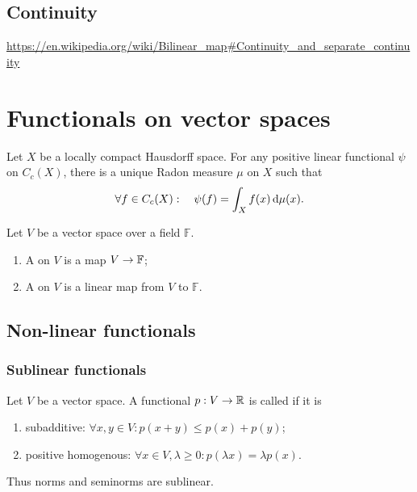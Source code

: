 \section{Continuity}
\url{https://en.wikipedia.org/wiki/Bilinear_map#Continuity_and_separate_continuity}



















\chapter{Functionals on vector spaces}

\begin{theorem}
Let $X$ be a locally compact Hausdorff space. For any positive linear functional $\psi$ on $C_c(X)$, there is a unique Radon measure $\mu$ on $X$ such that
\[ \forall f\in C_c(X): \quad \psi(f) = \int_X f(x)\operatorname{d \!}{\mu(x)}. \]
\end{theorem}

\begin{definition}
Let $V$ be a vector space over a field $\mathbb{F}$.
\begin{enumerate}
\item A  on $V$ is a map $V\to \mathbb{F}$;
\item A  on $V$ is a linear map from $V$ to $\mathbb{F}$.
\end{enumerate}
\end{definition}

\section{Non-linear functionals}
\subsection{Sublinear functionals}
\begin{definition}
Let $V$ be a vector space. A functional $p:V\to \mathbb{R}$ is called  if it is
\begin{enumerate}
\item subadditive: $\forall x,y\in V: p(x+y) \leq p(x) + p(y)$;
\item positive homogenous: $\forall x\in V,\lambda\geq 0: p(\lambda x) = \lambda p(x)$.
\end{enumerate}
\end{definition}
Thus norms and seminorms are sublinear.

